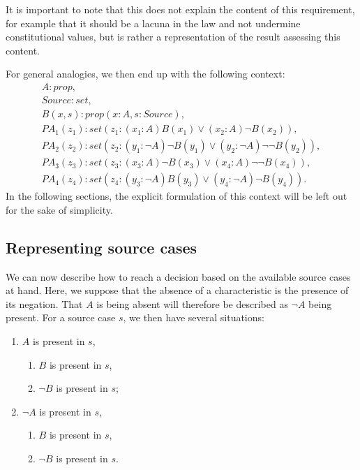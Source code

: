 		It is important to note that this does not explain the content of this requirement, for example that it should be a lacuna in the law and not undermine constitutional values, but is rather a representation of the result assessing this content. 
		
		For general analogies, we then end up with the following context:
			\[
			\begin{array}{c}
				A : prop,                                                                                \\
				Source : set,                                                                            \\
				B(x,s) : prop (x : A, s : Source),														\\
				PA_1(z_1) : set (z_1 : (x_1 : A) B(x_1) \lor (x_2 : A) \neg B(x_2)),                     \\
				PA_2(z_2) : set (z_2 : (y_1 : \neg A) \neg B(y_1) \lor (y_2 : \neg A) \neg \neg B(y_2)), \\
				PA_3(z_3) : set (z_3 : (x_3 : A) \neg B(x_3) \lor (x_4 : A) \neg \neg B(x_4)),           \\
				PA_4(z_4) : set (z_4 : (y_3 : \neg A) B(y_3) \lor (y_4 : \neg A) \neg B(y_4)).
			\end{array}
			\]
		In the following sections, the explicit formulation of this context will be left out for the sake of simplicity.
		
	\subsection{Representing source cases}
				 
		We can now describe how to reach a decision based on the available source cases at hand. Here, we suppose that the absence of a characteristic is the presence of its negation. That $A$ is being absent will therefore be described as $\neg A$ being present. For a source case $s$, we then have several situations: 
			\begin{enumerate}
				\item $A$ is present in $s$,
					\begin{enumerate}
						\item $B$ is present in $s$,
						\item $\neg B$ is present in $s$;
					\end{enumerate}
				\item  $\neg A$ is present in $s$,
					\begin{enumerate}
						\item $B$ is present in $s$,
						\item $\neg B$ is present in $s$.
					\end{enumerate}
			\end{enumerate}		
		
